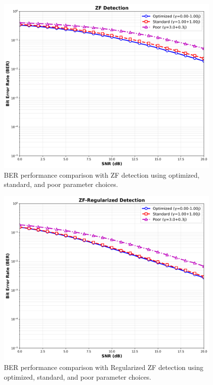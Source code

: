 \begin{figure}[!t]
\centering
\includegraphics[width=0.9\columnwidth]{figures/zf_detection.png} 
\caption{BER performance comparison with ZF detection using optimized, standard, and poor parameter choices.}
\label{fig:zf_plot}
\end{figure}

\begin{figure}[!t]
\centering
\includegraphics[width=0.9\columnwidth]{figures/zf_reg_detection.png} 
\caption{BER performance comparison with Regularized ZF detection using optimized, standard, and poor parameter choices.}
\label{fig:zf_reg_plot}
\end{figure}

